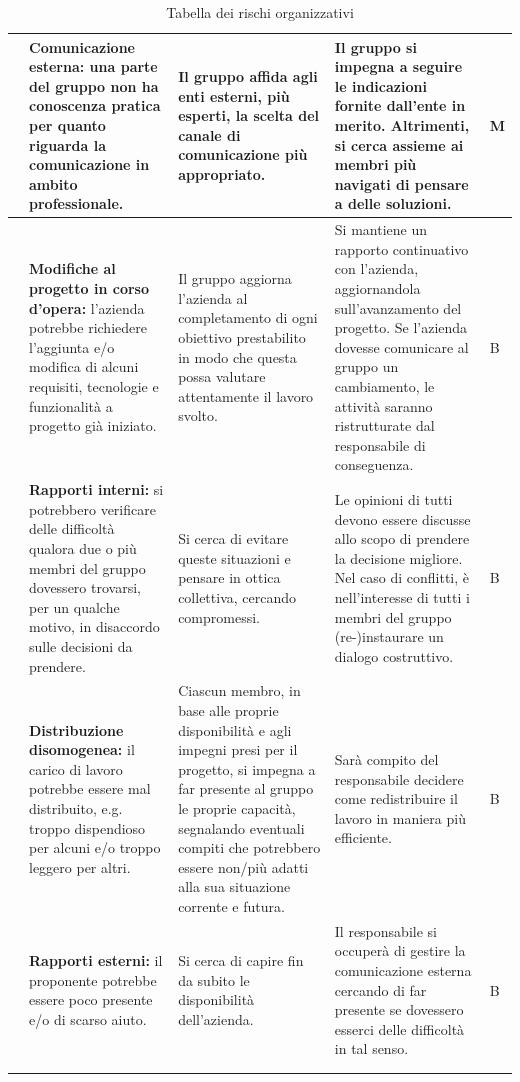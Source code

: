 \begin{xltabular}{\textwidth}{p{0.00001\textwidth} X | X | X | p{0.05\textwidth}}
    & \textbf{Comunicazione esterna:} una parte del gruppo non ha conoscenza pratica per quanto riguarda la comunicazione in ambito professionale.
    & Il gruppo affida agli enti esterni, più esperti, la scelta del canale di comunicazione più appropriato.
    & Il gruppo si impegna a seguire le indicazioni fornite dall'ente in merito. Altrimenti, si cerca assieme ai membri più navigati di pensare a delle soluzioni.
    & M \\
    \hline

    & \textbf{Modifiche al progetto in corso d'opera:} l'azienda potrebbe richiedere l'aggiunta e/o modifica di alcuni requisiti, tecnologie e funzionalità a progetto già iniziato.
    & Il gruppo aggiorna l'azienda al completamento di ogni obiettivo prestabilito in modo che questa possa valutare attentamente il lavoro svolto.
    & Si mantiene un rapporto continuativo con l'azienda, aggiornandola sull'avanzamento del progetto. Se l'azienda dovesse comunicare al gruppo un cambiamento, le attività saranno ristrutturate dal responsabile di conseguenza.
    & B \\
    \hline

    & \textbf{Rapporti interni:} si potrebbero verificare delle difficoltà qualora due o più membri del gruppo dovessero trovarsi, per un qualche motivo, in disaccordo sulle decisioni da prendere.
    & Si cerca di evitare queste situazioni e pensare in ottica collettiva, cercando compromessi.
    & Le opinioni di tutti devono essere discusse allo scopo di prendere la decisione migliore. Nel caso di conflitti, è nell'interesse di tutti i membri del gruppo (re-)instaurare un dialogo costruttivo.
    & B \\
    \hline

    & \textbf{Distribuzione disomogenea:} il carico di lavoro potrebbe essere mal distribuito, e.g. troppo dispendioso per alcuni e/o troppo leggero per altri. 
    & Ciascun membro, in base alle proprie disponibilità e agli impegni presi per il progetto, si impegna a far presente al gruppo le proprie capacità, segnalando eventuali compiti che potrebbero essere non/più adatti alla sua situazione corrente e futura.
    & Sarà compito del responsabile decidere come redistribuire il lavoro in maniera più efficiente.
    & B \\
    \hline

    & \textbf{Rapporti esterni: } il proponente potrebbe essere poco presente e/o di scarso aiuto.
    & Si cerca di capire fin da subito le disponibilità dell'azienda.
    & Il responsabile si occuperà di gestire la comunicazione esterna cercando di far presente se dovessero esserci delle difficoltà in tal senso.
    & B \\
    \hline \\

    \caption{Tabella dei rischi organizzativi}
    \label{tab:rischi:org}
\end{xltabular}

